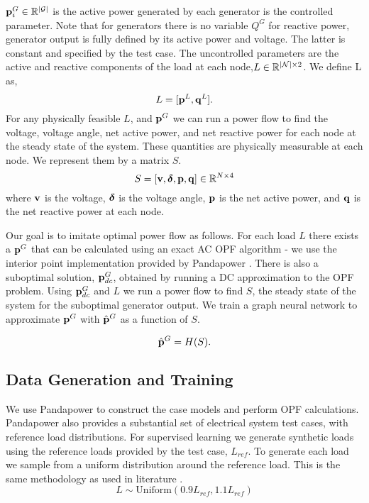\documentclass[conference,9pt]{IEEEtran}
\begin{document}
	${\mathbf p}^G_i \in \mathbb{R}^{|{\mathcal G}|}$ is the active power generated by each generator is the controlled parameter. Note that for generators there is no variable $Q^G$ for reactive power, generator output is fully defined by its active power and voltage. The latter is constant and specified by the test case. The uncontrolled parameters are the active and reactive components of the load at each node,$L \in \mathbb{R}^{|{\mathcal N}| \times 2}$. We define L as,
	\begin{equation}
		L = [{\mathbf p}^L, {\mathbf q}^L].
	\end{equation}
	For any physically feasible $L$, and ${\mathbf p}^G$ we can run a power flow to find the voltage, voltage angle, net active power, and net reactive power for each node at the steady state of the system. These quantities are physically measurable at each node. We represent them by a matrix $S$.
	\begin{equation}
		S = [{\mathbf v}, \boldsymbol{\delta}, {\mathbf p}, {\mathbf q}] \in \mathbb{R}^{N \times 4}
	\end{equation}
	where ${\mathbf v}$ is the voltage, $\boldsymbol{\delta}$ is the voltage angle, ${\mathbf p}$ is the net active power, and ${\mathbf q}$ is the net reactive power at each node.
	
	Our goal is to imitate optimal power flow as follows. For each load $L$ there exists a ${\mathbf p}^G$ that can be calculated using an exact AC OPF algorithm - we use the interior point implementation provided by Pandapower \cite{pandapower}. There is also a suboptimal solution, ${\mathbf p}^G_{dc}$, obtained by running a DC approximation to the OPF problem. Using ${\mathbf p}^G_{dc}$ and $L$ we run a power flow to find $S$, the steady state of the system for the suboptimal generator output. We train a graph neural network to approximate ${\mathbf p}^G$ with ${\hat{\mathbf p} }^G$ as a function of $S$.
	
	\begin{equation}
		{\hat{\ensuremath{\mathbf p}} }^G = H(S).
	\end{equation}
	
	\subsection{Data Generation and Training}
	We use Pandapower \cite{pandapower} to construct the case models and perform OPF calculations. Pandapower also provides a substantial set of electrical system test cases, with reference load distributions. For supervised learning we generate synthetic loads using the reference loads provided by the test case, $L_{ref}$. To generate each load we sample from a uniform distribution around the reference load. This is the same methodology as used in literature \cite{guha}.
	\begin{equation}
		L \sim \text{Uniform}(0.9L_{ref}, 1.1L_{ref})
	\end{equation}
	
\end{document}
